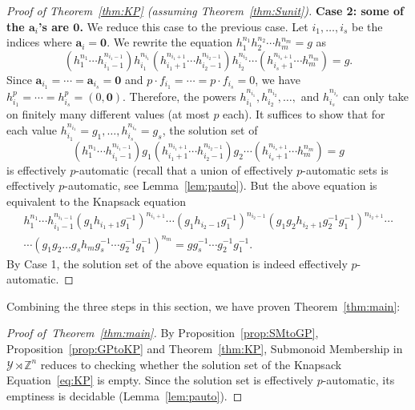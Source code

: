 \documentclass[a4paper,UKenglish,cleveref, autoref, thm-restate]{lipics-v2021}
\newcommand{\Z}{\mathbb{Z}}
\newcommand{\mY}{\mathcal{Y}}
\newcommand{\ba}{\boldsymbol{a}}
\newcommand{\bzer}{\boldsymbol{0}}
\theoremstyle{definition}
\theoremstyle{definition}
\theoremstyle{definition}
\begin{document}
\begin{proof}[Proof of Theorem~\ref{thm:KP} (assuming Theorem~\ref{thm:Sunit})]
    \textbf{Case 2: some of the $\ba_i$'s are $\bzer$.} 
    We reduce this case to the previous case. Let $i_1, \ldots, i_s$ be the indices where $\ba_i = \bzer$.
    We rewrite the equation $h_1^{n_1} h_2^{n_2} \cdots h_m^{n_m} = g$ as 
    \[
    \left(h_1^{n_1} \cdots h_{i_1 - 1}^{n_{i_1 - 1}}\right) h_{i_1}^{n_{i_1}} \left(h_{i_1 + 1}^{n_{i_1 + 1}} \cdots h_{i_2 - 1}^{n_{i_2 - 1}} \right) h_{i_2}^{n_{i_2}} \cdots \left(h_{i_s + 1}^{n_{i_s + 1}} \cdots h_{m}^{n_{m}} \right) = g.
    \]
    Since $\ba_{i_1} = \cdots = \ba_{i_s} = \bzer$ and $p \cdot f_{i_1} = \cdots = p \cdot f_{i_s} = 0$, we have $h_{i_1}^p = \cdots = h_{i_s}^p = (0, \bzer)$. Therefore, the powers $h_{i_1}^{n_{i_1}}, h_{i_2}^{n_{i_2}}, \ldots,$ and $h_{i_s}^{n_{i_s}}$ can only take on finitely many different values (at most $p$ each). It suffices to show that for each value $h_{i_1}^{n_{i_1}} = g_1, \ldots, h_{i_s}^{n_{i_s}} = g_s$, the solution set of
    \[
    \left(h_1^{n_1} \cdots h_{i_1 - 1}^{n_{i_1 - 1}}\right) g_1 \left(h_{i_1 + 1}^{n_{i_1 + 1}} \cdots h_{i_2 - 1}^{n_{i_2 - 1}} \right) g_2 \cdots \left(h_{i_s + 1}^{n_{i_s + 1}} \cdots h_{m}^{n_{m}} \right) = g
    \]
    is effectively $p$-automatic (recall that a union of effectively $p$-automatic sets is effectively $p$-automatic, see Lemma~\ref{lem:pauto}).
    But the above equation is equivalent to the Knapsack equation
    \begin{multline*}
        h_1^{n_1} \cdots h_{i_1 - 1}^{n_{i_1 - 1}} \left(g_1 h_{i_1 + 1} g_1^{-1}\right)^{n_{i_1 + 1}} \cdots \left( g_1 h_{i_2 - 1} g_1^{-1}\right)^{n_{i_2 - 1}} \left(g_1 g_2 h_{i_2 + 1} g_2^{-1} g_1^{-1}\right)^{n_{i_2 + 1}} \cdots \\
        \cdots \left(g_1 g_2 \dots g_s h_{m} g_s^{-1} \cdots g_2^{-1} g_1^{-1} \right)^{n_{m}} = g g_s^{-1} \cdots g_2^{-1} g_1^{-1}.
    \end{multline*}
    By Case 1, the solution set of the above equation is indeed effectively $p$-automatic.
\end{proof}

Combining the three steps in this section, we have proven Theorem~\ref{thm:main}:

\begin{proof}[Proof of~Theorem~\ref{thm:main}]
    By Proposition~\ref{prop:SMtoGP}, Proposition~\ref{prop:GPtoKP} and Theorem~\ref{thm:KP}, Submonoid Membership in $\mY \rtimes \Z^n$ reduces to checking whether the solution set of the Knapsack Equation~\eqref{eq:KP} is empty. Since the solution set is effectively $p$-automatic, its emptiness is decidable (Lemma~\ref{lem:pauto}).
\end{proof}
\end{document}

